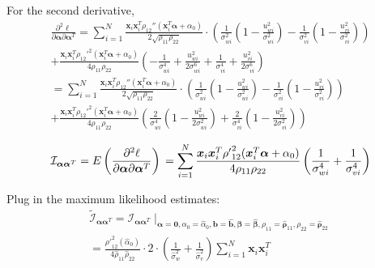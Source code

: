 \documentclass[aap,authoryear, preprint]{imsart}
\numberwithin{equation}{section}
\theoremstyle{plain}
\begin{document}
For the second derivative, 
\begin{equation}
    \begin{multlined}
    \frac{\partial^2 \ell}{\partial \bm{\alpha} \partial \bm{\alpha}^T}
    = \sum_{i=1}^{N} \frac{\bm{x}_i \bm{x}_i^T \rho_{12}''(\bm{x}_i^T\bm{\alpha}+\alpha_0)}{2\sqrt{\rho_{11}\rho_{22}}} \cdot
    \left(
    \frac{1}{\sigma_{wi}^2} \left( 1 - \frac{u_{wi}^2}{\sigma_{wi}^2}\right) - 
    \frac{1}{\sigma_{vi}^2} \left( 1 - \frac{u_{vi}^2}{\sigma_{vi}^2} \right)
    \right)\\
    + \frac{\bm{x}_i \bm{x}_i^T {\rho_{12}'}^2(\bm{x}_i^T\bm{\alpha} + \alpha_0)}{4\rho_{11}\rho_{22}}
    \left(
    -\frac{1}{\sigma_{wi}^4} + \frac{u_{wi}^2}{2\sigma_{wi}^6} + 
    \frac{1}{\sigma_{vi}^4} + \frac{u_{vi}^2}{2\sigma_{vi}^6}
    \right)\\
    = \sum_{i=1}^{N} \frac{\bm{x}_i \bm{x}_i^T \rho_{12}''(\bm{x}_i^T\bm{\alpha}+\alpha_0)}{2\sqrt{\rho_{11}\rho_{22}}} \cdot
    \left(
    \frac{1}{\sigma_{wi}^2} \left( 1 - \frac{u_{wi}^2}{\sigma_{wi}^2}\right) - 
    \frac{1}{\sigma_{vi}^2} \left( 1 - \frac{u_{vi}^2}{\sigma_{vi}^2} \right)
    \right)\\
    + \frac{\bm{x}_i \bm{x}_i^T {\rho_{12}'}^2(\bm{x}_i^T\bm{\alpha}+\alpha_0)}{4\rho_{11}\rho_{22}}
    \left(
    \frac{2}{\sigma_{wi}^4} \left(1-\frac{u_{wi}^2}{2\sigma_{wi}^2}\right)+
    \frac{2}{\sigma_{vi}^4} \left(1-\frac{u_{vi}^2}{2\sigma_{vi}^2}\right)
    \right)
    \end{multlined}
\end{equation}

\begin{equation}
    \mathcal{I}_{\bm{\alpha}\bm{\alpha}^T} = E\left(\frac{\partial^2 \ell}{\partial \bm{\alpha} \partial \bm{\alpha}^T}\right)\\
    = \sum_{i=1}^{N} \frac{\bm{x}_i \bm{x}_i^T {\rho '}^2_{12}(\bm{x}_i^T\bm{\alpha}+\alpha_0)}{4\rho_{11}\rho_{22}} \left(
    \frac{1}{\sigma_{wi}^4} + \frac{1}{\sigma_{vi}^4}
    \right)
\end{equation}

Plug in the maximum likelihood estimates:
\begin{equation}
\begin{multlined}
        \tilde{\mathcal{I}}_{\bm{\alpha}\bm{\alpha}^T} = \mathcal{I}_{\bm{\alpha}\bm{\alpha}^T}\mid_{
        \bm{\alpha}=\bm{0}, 
        \alpha_0 = \hat{\alpha}_0,
        \bm{b} = \bm{\hat{b}},
        \bm{\beta} = \bm{\hat{\beta}},
        {\rho}_{11} = \bm{\hat{\rho}}_{11},
        {\rho}_{22} = \bm{\hat{\rho}}_{22}}\\
        = \frac{{\rho '}^2_{12}({\hat{\alpha}_0})}{4\hat{\rho}_{11}\hat{\rho}_{22}}\cdot 2 \cdot \left(\frac{1}{\hat{\sigma}_{w}^2} + \frac{1}{\hat{\sigma}_{v}^2} \right) \sum_{i=1}^{N} \bm{x}_i \bm{x}_i^T
    \end{multlined}
\end{equation}
\end{document}
